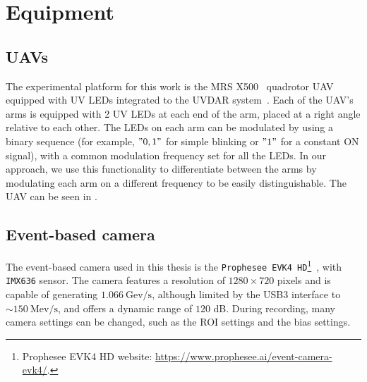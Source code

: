 \section{Equipment}

\subsection{UAVs}
The experimental platform for this work is the \ac{MRS} X500~\cite{hertmrs} quadrotor \ac{UAV} equipped with \ac{UV} \ac{LED}s
integrated to the UVDAR system~\cite{walteruvdar}.
Each of the \ac{UAV}'s arms is equipped with 2 \ac{UV} \ac{LED}s at each end of the arm, placed at a right angle relative to each other.
The \ac{LED}s on each arm can be modulated
by using a binary sequence (for example, $"0, 1"$ for simple blinking or $"1"$ for a constant ON signal), with a common modulation frequency set for all the \ac{LED}s.
In our approach, we use this functionality to differentiate between the arms by modulating each arm on a different frequency to be easily distinguishable.
The \ac{UAV} can be seen in .

\subsection{Event-based camera}
The event-based camera used in this thesis is the \texttt{Prophesee EVK4 HD}\footnote{Prophesee EVK4 HD website: \url{https://www.prophesee.ai/event-camera-evk4/}.}~\cite{propheseeevk4},
with \texttt{IMX636} sensor. The camera features a resolution of $1280 \times 720$ pixels and is capable of generating $1.066\ \text{Gev}/\text{s}$,
although limited by the USB3 interface to $\sim 150\ \text{Mev}/\text{s}$, and offers a dynamic range of $120$ dB.
During recording, many camera settings can be changed, such as the \ac{ROI} settings and the bias settings.

